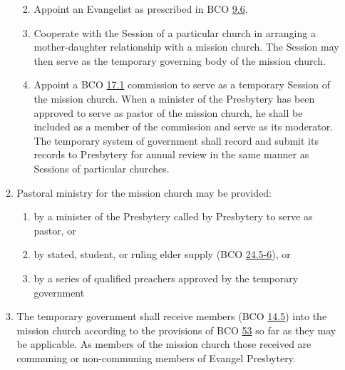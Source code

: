 \documentclass[
]{book}
\providecommand{\tightlist}{%
  \setlength{\itemsep}{0pt}\setlength{\parskip}{0pt}}
\begin{document}
\begin{enumerate}
\begin{enumerate}
    \begin{enumerate}
    \def\labelenumiii{\roman{enumiii}.}
    \tightlist
    \item
      Appoint an Evangelist as prescribed in BCO \protect\hyperlink{9.6}{9.6}.
    \item
      Cooperate with the Session of a particular church in arranging a mother-daughter relationship with a mission church. The Session may then serve as the temporary governing body of the mission church.
    \item
      Appoint a BCO \protect\hyperlink{17.1}{17.1} commission to serve as a temporary Session of the mission church. When a minister of the Presbytery has been approved to serve as pastor of the mission church, he shall be included as a member of the commission and serve as its moderator. The temporary system of government shall record and submit its records to Presbytery for annual review in the same manner as Sessions of particular churches.
    \end{enumerate}
  \item
    \protect\hypertarget{6.1.c}{\href{}{}}Pastoral ministry for the mission church may be provided:

    \begin{enumerate}
    \def\labelenumiii{\roman{enumiii}.}
    \tightlist
    \item
      by a minister of the Presbytery called by Presbytery to serve as pastor, or
    \item
      by stated, student, or ruling elder supply (BCO \protect\hyperlink{24.5}{24.5-6}), or
    \item
      by a series of qualified preachers approved by the temporary government
    \end{enumerate}
  \item
    \protect\hypertarget{6.1.d}{\href{}{}}The temporary government shall receive members (BCO \protect\hyperlink{14.5}{14.5}) into the mission church according to the provisions of BCO \protect\hyperlink{53}{53} so far as they may be applicable. As members of the mission church those received are communing or non-communing members of Evangel Presbytery.


\end{enumerate}
\end{enumerate}
\end{document}
